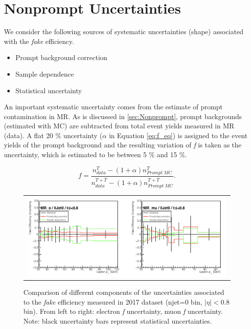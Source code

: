 \section{Nonprompt Uncertainties}
\label{sec:NonUnc}

We consider the following sources of systematic uncertainties (shape) associated with the \emph{fake} efficiency.

\begin{itemize}
\item Prompt background correction
\item Sample dependence 
\item Statistical uncertainty 
\end{itemize}

An important systematic uncertainty comes from the estimate of prompt contamination in MR. As is discussed in \autoref{sec:Nonprompt}, prompt backgrounds (estimated with MC) are subtracted from total event yields measured in MR (data). A flat 20 $\%$ uncertainty ($\alpha$ in Equation \ref{eq:f_eq}) is assigned to the event yields of the prompt background and the resulting variation of \emph{f} is taken as the uncertainty, which is estimated to be between 5 $\%$ and 15 $\%$.

\begin{equation}
f=\frac{n_{data}^{T}-(1+\alpha)n_{Prompt~MC}^{T}}{n_{data}^{T+\overline{T}}-(1+\alpha)n_{Prompt~MC}^{T+\overline{T}}}.
\label{eq:f_eq}
\end{equation}  

\begin{figure}[tbh!]
 \begin{center}
 \begin{tabular}{c}
 \includegraphics[width=0.99\textwidth]{figures/Part3/Systematics/MR1}
 \end{tabular}
 \caption{Comparison of different components of the uncertainties associated to the \emph{fake} efficiency measured in 2017 dataset (njet=0 bin, $|\eta|<$0.8 bin). From left to right: electron \emph{f} uncertainty, muon \emph{f} uncertainty. Note: black uncertainty bars represent statistical uncertainties.}
 \label{fig:f_comp1}
 \end{center}
\end{figure}

